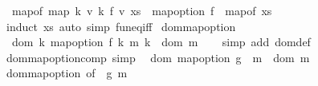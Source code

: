 \begin{isabellebody}
\ \ {\isachardoublequoteopen}map{\isacharunderscore}{\kern0pt}of\ {\isacharparenleft}{\kern0pt}map\ {\isacharparenleft}{\kern0pt}{\isasymlambda}{\isacharparenleft}{\kern0pt}k{\isacharcomma}{\kern0pt}\ v{\isacharparenright}{\kern0pt}{\isachardot}{\kern0pt}\ {\isacharparenleft}{\kern0pt}k{\isacharcomma}{\kern0pt}\ f\ v{\isacharparenright}{\kern0pt}{\isacharparenright}{\kern0pt}\ xs{\isacharparenright}{\kern0pt}\ {\isacharequal}{\kern0pt}\ map{\isacharunderscore}{\kern0pt}option\ f\ {\isasymcirc}\ map{\isacharunderscore}{\kern0pt}of\ xs{\isachardoublequoteclose}\isanewline
%
\isadelimproof
\ \ %
\endisadelimproof
%
\isatagproof
{}\isamarkupfalse%
\ {\isacharparenleft}{\kern0pt}induct\ xs{\isacharparenright}{\kern0pt}\ {\isacharparenleft}{\kern0pt}auto\ simp{\isacharcolon}{\kern0pt}\ fun{\isacharunderscore}{\kern0pt}eq{\isacharunderscore}{\kern0pt}iff{\isacharparenright}{\kern0pt}%
\endisatagproof
{\isafoldproof}%
%
\isadelimproof
\isanewline
%
\endisadelimproof
\isanewline
{}\isamarkupfalse%
\ dom{\isacharunderscore}{\kern0pt}map{\isacharunderscore}{\kern0pt}option{\isacharcolon}{\kern0pt}\isanewline
\ \ {\isachardoublequoteopen}dom\ {\isacharparenleft}{\kern0pt}{\isasymlambda}k{\isachardot}{\kern0pt}\ map{\isacharunderscore}{\kern0pt}option\ {\isacharparenleft}{\kern0pt}f\ k{\isacharparenright}{\kern0pt}\ {\isacharparenleft}{\kern0pt}m\ k{\isacharparenright}{\kern0pt}{\isacharparenright}{\kern0pt}\ {\isacharequal}{\kern0pt}\ dom\ m{\isachardoublequoteclose}\isanewline
%
\isadelimproof
\ \ %
\endisadelimproof
%
\isatagproof
{}\isamarkupfalse%
\ {\isacharparenleft}{\kern0pt}simp\ add{\isacharcolon}{\kern0pt}\ dom{\isacharunderscore}{\kern0pt}def{\isacharparenright}{\kern0pt}%
\endisatagproof
{\isafoldproof}%
%
\isadelimproof
\isanewline
%
\endisadelimproof
\isanewline
{}\isamarkupfalse%
\ dom{\isacharunderscore}{\kern0pt}map{\isacharunderscore}{\kern0pt}option{\isacharunderscore}{\kern0pt}comp\ {\isacharbrackleft}{\kern0pt}simp{\isacharbrackright}{\kern0pt}{\isacharcolon}{\kern0pt}\isanewline
\ \ {\isachardoublequoteopen}dom\ {\isacharparenleft}{\kern0pt}map{\isacharunderscore}{\kern0pt}option\ g\ {\isasymcirc}\ m{\isacharparenright}{\kern0pt}\ {\isacharequal}{\kern0pt}\ dom\ m{\isachardoublequoteclose}\isanewline
%
\isadelimproof
\ \ %
\endisadelimproof
%
\isatagproof
{}\isamarkupfalse%
\ dom{\isacharunderscore}{\kern0pt}map{\isacharunderscore}{\kern0pt}option\ {\isacharbrackleft}{\kern0pt}of\ {\isachardoublequoteopen}{\isasymlambda}{\isacharunderscore}{\kern0pt}{\isachardot}{\kern0pt}\ g{\isachardoublequoteclose}\ m{\isacharbrackright}{\kern0pt}\ \isamarkupfalse%

\end{isabellebody}
